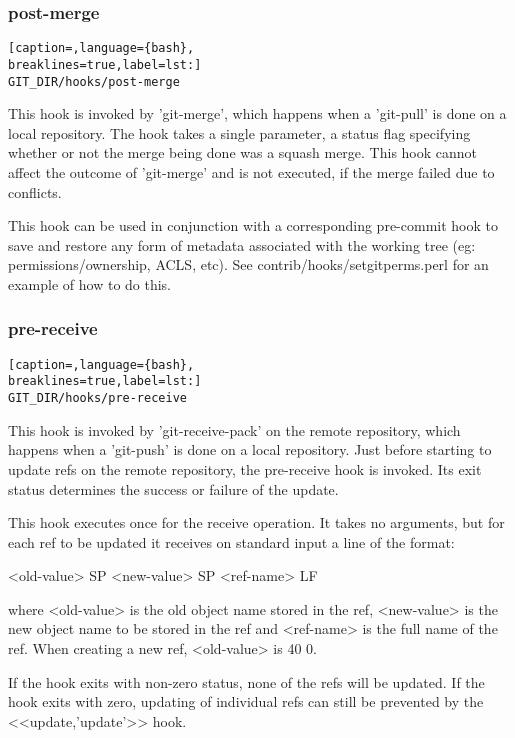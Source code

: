 \subsubsection{post-merge}
\lstset{basicstyle=\scriptsize, numbers=none, captionpos=b, tabsize=4}
\begin{lstlisting}[caption=,language={bash},
breaklines=true,label=lst:]
GIT_DIR/hooks/post-merge
\end{lstlisting}

This hook is invoked by 'git-merge', which happens when a 'git-pull' is done on
a local repository. The hook takes a single parameter, a status flag specifying
whether or not the merge being done was a squash merge. This hook cannot affect
the outcome of 'git-merge' and is not executed, if the merge failed due to
conflicts.

This hook can be used in conjunction with a corresponding pre-commit hook to
save and restore any form of metadata associated with the working tree (eg:
permissions/ownership, ACLS, etc). See contrib/hooks/setgitperms.perl for an
example of how to do this.

\subsubsection{pre-receive}
\lstset{basicstyle=\scriptsize, numbers=none, captionpos=b, tabsize=4}
\begin{lstlisting}[caption=,language={bash},
breaklines=true,label=lst:]
GIT_DIR/hooks/pre-receive
\end{lstlisting}

This hook is invoked by 'git-receive-pack' on the remote repository, which
happens when a 'git-push' is done on a local repository. Just before starting
to update refs on the remote repository, the pre-receive hook is invoked. Its
exit status determines the success or failure of the update.

This hook executes once for the receive operation. It takes no arguments, but
for each ref to be updated it receives on standard input a line of the format:

<old-value> SP <new-value> SP <ref-name> LF

where <old-value> is the old object name stored in the ref, <new-value> is the
new object name to be stored in the ref and <ref-name> is the full name of the
ref. When creating a new ref, <old-value> is 40 0.

If the hook exits with non-zero status, none of the refs will be updated. If
the hook exits with zero, updating of individual refs can still be prevented by
the <<update,'update'>> hook.

